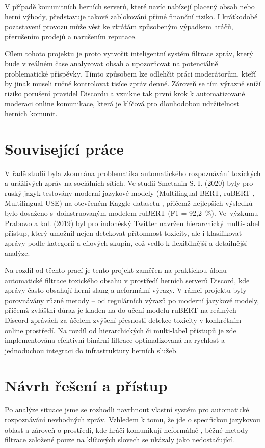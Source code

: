 \documentclass[FM,Proj]{tulthesis}
\begin{document}
V případě komunitních herních serverů, které navíc nabízejí placený obsah nebo herní výhody, představuje takové zablokování přímé finanční riziko. I krátkodobé pozastavení provozu může vést ke ztrátám způsobeným výpadkem hráčů, přerušením prodejů a narušením reputace.

Cílem tohoto projektu je proto vytvořit inteligentní systém filtrace zpráv, který bude v reálném čase analyzovat obsah a upozorňovat na potenciálně problematické příspěvky. Tímto způsobem lze odlehčit práci moderátorům, kteří by jinak museli ručně kontrolovat tisíce zpráv denně. Zároveň se tím výrazně sníží riziko porušení pravidel Discordu a vznikne tak první krok k automatizované moderaci online komunikace, která je klíčová pro dlouhodobou udržitelnost herních komunit.

\section{Související práce}

V řadě studií byla zkoumána problematika automatického rozpoznávání toxických a urážlivých zpráv na sociálních sítích. Ve studii Smetanin S. I. (2020) \cite{smetanin2020toxic} byly pro ruský jazyk testovány moderní jazykové modely (Multilingual BERT, ruBERT \cite{deeppavlov2020rubertcasebased}, Multilingual USE) na otevřeném Kaggle datasetu \cite{blackmoon2019russiantoxiccomments}, přičemž nejlepších výsledků bylo dosaženo s~doinstruovaným modelem ruBERT (F1 = 92{,}2~\%). Ve~výzkumu Prabowo a kol. (2019) \cite{prabowo2019identifyhatespeech} byl pro indonéský Twitter navržen hierarchický multi-label přístup, který umožnil nejen detekovat přítomnost toxicity, ale i klasifikovat zprávy podle kategorií a cílových skupin, což vedlo k flexibilnější a detailnější analýze.

Na rozdíl od těchto prací je tento projekt zaměřen na praktickou úlohu automatické filtrace toxického obsahu v prostředí herních serverů Discord, kde zprávy často obsahují herní slang a neformální výrazy. V rámci projektu byly porovnávány různé metody -- od regulárních výrazů po moderní jazykové modely, přičemž zvláštní důraz je kladen na do-učení modelu ruBERT na reálných Discord zprávách za účelem zvýšení přesnosti detekce toxicity v konkrétním online prostředí. Na rozdíl od hierarchických či multi-label přístupů je zde implementována efektivní binární filtrace optimalizovaná na rychlost a jednoduchou integraci do infrastruktury herních služeb.

\section{Návrh řešení a přístup}\label{deklarace} 
Po analýze situace jsme se rozhodli navrhnout vlastní systém pro automatické rozpoznávání nevhodných zpráv. Vzhledem k tomu, že jde o specifickou jazykovou oblast a zároveň o prostředí, kde hráči komunikují neformálně , běžné metody filtrace založené pouze na klíčových slovech se ukázaly jako nedostačující.
\end{document}
